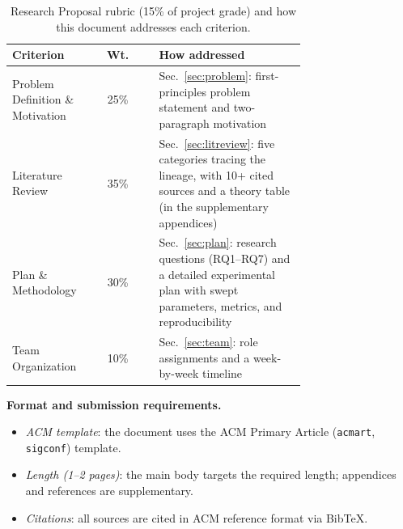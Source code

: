 \documentclass[sigconf,nonacm]{acmart}
\begin{document}
\begin{table}[h]
  \centering
  \caption{Research Proposal rubric (15\% of project grade) and how this
  document addresses each criterion.}
  \label{tab:rubric}
  \small
  \begin{tabular}{@{}p{0.22\linewidth}cp{0.50\linewidth}@{}}
    \toprule
    \textbf{Criterion} & \textbf{Wt.} & \textbf{How addressed} \\
    \midrule
    Problem Definition \& Motivation & 25\% &
      Sec.~\ref{sec:problem}: first-principles problem statement and two-paragraph
      motivation \\
    Literature Review & 35\% &
      Sec.~\ref{sec:litreview}: five categories tracing the lineage, with 10+
      cited sources and a theory table (in the supplementary appendices) \\
    Plan \& Methodology & 30\% &
      Sec.~\ref{sec:plan}: research questions (RQ1--RQ7) and a detailed
      experimental plan with swept parameters, metrics, and reproducibility \\
    Team Organization & 10\% &
      Sec.~\ref{sec:team}: role assignments and a week-by-week timeline \\
    \bottomrule
  \end{tabular}
\end{table}

\noindent\textbf{Format and submission requirements.}
\begin{itemize}
  \item \emph{ACM template}: the document uses the ACM Primary Article
    (\texttt{acmart}, \texttt{sigconf}) template.
  \item \emph{Length (1--2 pages)}: the main body targets the required length;
    appendices and references are supplementary.
  \item \emph{Citations}: all sources are cited in ACM reference format via
    BibTeX.
\end{itemize}
\end{document}
